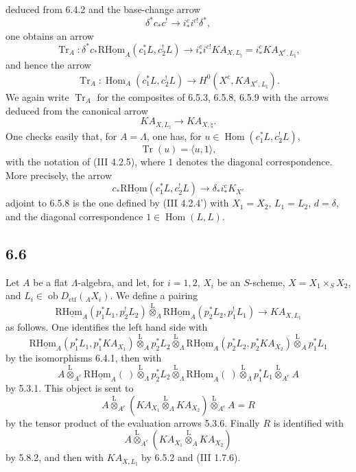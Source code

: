 \documentclass[11pt]{article}
\DeclareMathOperator{\Hom}{Hom}
\providecommand{\Tr}{\operatorname{Tr}}
\providecommand{\Tr}{\operatorname{Tr}}
\providecommand{\lten}{\overset{\mathrm L}{\otimes}}
\providecommand{\Ob}{\operatorname{ob}}
\providecommand{\Tr}{\operatorname{Tr}}
\providecommand{\Hom}{\operatorname{Hom}}
\providecommand{\lten}{\overset{\mathrm L}{\otimes}}
\providecommand{\lten}{\overset{\mathrm L}{\otimes}}
\providecommand{\Ob}{\operatorname{ob}}
\providecommand{\Tr}{\operatorname{Tr}}
\providecommand{\lten}{\overset{\mathrm L}{\otimes}}
\providecommand{\lten}{\overset{\mathrm L}{\otimes}}
\providecommand{\Ob}{\operatorname{Ob}}
\providecommand{\lten}{\overset{\mathrm L}{\otimes}}
\providecommand{\Hom}{\operatorname{Hom}}
\providecommand{\Tr}{\operatorname{Tr}}
\providecommand{\Ob}{\operatorname{ob}}
\providecommand{\Ob}{\operatorname{Ob}}
\providecommand{\lten}{\overset{\mathrm L}{\otimes}}
\begin{document}
deduced from 6.4.2 and the base-change arrow
\[
\delta^*c_*c^!\longrightarrow i_*^ci^{c!}\delta^*,
\]
one obtains an arrow
\begin{equation}
\Tr_A:\delta^*c_*\mathrm{R}\underline{\mathrm{Hom}}_A(c_1^*L,c_2^!L)
\longrightarrow
i_*^ci^{c!}KA_{X,L_{\natural}}
=i_*^cKA_{X^c,L_{\natural}},
\tag{6.5.8}
\end{equation}
and hence the arrow
\begin{equation}
\Tr_A:\Hom_A(c_1^*L,c_2^!L)
\longrightarrow
H^0(X^c,KA_{X^c,L_{\natural}}).
\tag{6.5.9}
\end{equation}
We again write $\Tr_A$ for the composites of 6.5.3, 6.5.8, 6.5.9 with the arrows deduced from the canonical arrow
\[
KA_{X,L_{\natural}}\longrightarrow KA_{X,\natural}.
\]
One checks easily that, for $A=\Lambda$, one has, for $u\in\Hom(c_1^*L,c_2^!L)$,
\begin{equation}
\Tr(u)=\langle u,1\rangle,
\tag{6.5.10}
\end{equation}
with the notation of (III 4.2.5), where $1$ denotes the diagonal correspondence. More precisely, the arrow
\[
c_*\mathrm{R}\underline{\mathrm{Hom}}(c_1^*L,c_2^!L)\longrightarrow \delta_*i_*^cK_{X^c}
\]
adjoint to 6.5.8 is the one defined by (III 4.2.4') with $X_1=X_2$, $L_1=L_2$, $d=\delta$, and the diagonal correspondence $1\in\Hom(L,L)$.

\subsection*{6.6}
Let $A$ be a flat $\Lambda$-algebra, and let, for $i=1,2$, $X_i$ be an $S$-scheme, $X=X_1\times_SX_2$, and $L_i\in\Ob D_{\mathrm{ctf}}({}_AX_i)$. We define a pairing
\begin{equation}
\mathrm{R}\underline{\mathrm{Hom}}_A(p_1^*L_1,p_2^!L_2)
\lten_{\Lambda}
\mathrm{R}\underline{\mathrm{Hom}}_A(p_2^*L_2,p_1^!L_1)
\longrightarrow
KA_{X,L_{\natural}}
\tag{6.6.1}
\end{equation}
as follows. One identifies the left hand side with
\[
\mathrm{R}\underline{\mathrm{Hom}}_A(p_1^*L_1,p_1^*KA_{X_1})
\lten_A p_2^*L_2
\lten_{\Lambda}
\mathrm{R}\underline{\mathrm{Hom}}_A(p_2^*L_2,p_2^*KA_{X_2})
\lten_A p_1^*L_1
\]
by the isomorphisms 6.4.1, then with
\[
A\lten_{A^e}\mathrm{R}\underline{\mathrm{Hom}}_A(\ )\lten_{\Lambda}p_2^*L_2
 \lten_{\Lambda}\mathrm{R}\underline{\mathrm{Hom}}_A(\ )\lten_{\Lambda}p_1^*L_1\lten_{A^e}A
\]
by 5.3.1. This object is sent to
\[
A\lten_{A^e}(KA_{X_1}\lten_{\Lambda}KA_{X_2})\lten_{A^e}A=R
\]
by the tensor product of the evaluation arrows 5.3.6. Finally $R$ is identified with
\[
A\lten_{A^e}(KA_{X_1}\lten_AKA_{X_2})
\]
by 5.8.2, and then with $KA_{X,L_{\natural}}$ by 6.5.2 and (III 1.7.6).
\end{document}

